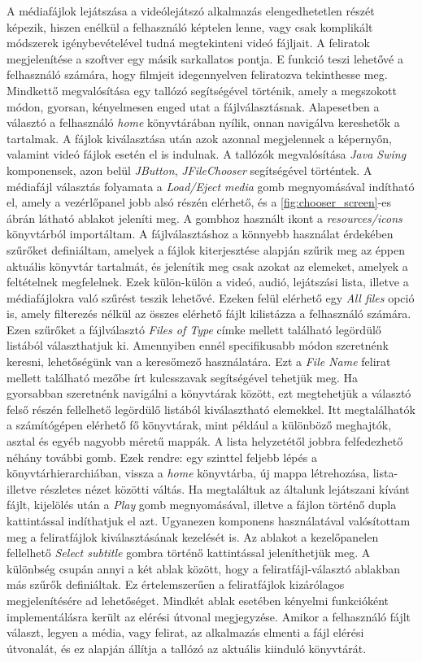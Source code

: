 A médiafájlok lejátszása a videólejátszó alkalmazás elengedhetetlen részét képezik, hiszen enélkül a felhasználó képtelen lenne, vagy csak komplikált módszerek igénybevételével tudná megtekinteni videó fájljait. A feliratok megjelenítése a szoftver egy másik sarkallatos pontja. E funkció teszi lehetővé a felhasználó számára, hogy filmjeit idegennyelven feliratozva tekinthesse meg. Mindkettő megvalósítása egy tallózó segítségével történik, amely a megszokott módon, gyorsan, kényelmesen enged utat a fájlválasztásnak. Alapesetben a választó a felhasználó \textit{home} könyvtárában nyílik, onnan navigálva kereshetők a tartalmak. A fájlok kiválasztása után azok azonnal megjelennek a képernyőn, valamint videó fájlok esetén el is indulnak. A tallózók megvalósítása \textit{Java Swing} komponensek, azon belül \textit{JButton}, \textit{JFileChooser} segítségével történtek. A médiafájl választás folyamata a \textit{Load/Eject media} gomb megnyomásával indítható el, amely a vezérlőpanel jobb alsó részén elérhető, és a \ref{fig:chooser_screen}-es ábrán látható ablakot jeleníti meg. A gombhoz használt ikont a \textit{resources/icons} könyvtárból importáltam. A fájlválasztáshoz a könnyebb használat érdekében szűrőket definiáltam, amelyek a fájlok kiterjesztése alapján szűrik meg az éppen aktuális könyvtár tartalmát, és jelenítik meg csak azokat az elemeket, amelyek a feltételnek megfelelnek. Ezek külön-külön a videó, audió, lejátszási lista, illetve a médiafájlokra való szűrést teszik lehetővé. Ezeken felül elérhető egy \textit{All files} opció is, amely filterezés nélkül az összes elérhető fájlt kilistázza a felhasználó számára. Ezen szűrőket a fájlválasztó \textit{Files of Type} címke mellett található legördülő listából választhatjuk ki. Amennyiben ennél specifikusabb módon szeretnénk keresni, lehetőségünk van a keresőmező használatára. Ezt a \textit{File Name} felirat mellett található mezőbe írt kulcsszavak segítségével tehetjük meg. Ha gyorsabban szeretnénk navigálni a könyvtárak között, ezt megtehetjük a választó felső részén fellelhető legördülő listából kiválasztható elemekkel. Itt megtalálhatók a számítógépen elérhető fő könyvtárak, mint például a különböző meghajtók, asztal és egyéb nagyobb méretű mappák. A lista helyzetétől jobbra felfedezhető néhány további gomb. Ezek rendre: egy szinttel feljebb lépés a könyvtárhierarchiában, vissza a \textit{home} könyvtárba, új mappa létrehozása, lista- illetve részletes nézet közötti váltás. Ha megtaláltuk az általunk lejátszani kívánt fájlt, kijelölés után a \textit{Play} gomb megnyomásával, illetve a fájlon történő dupla kattintással indíthatjuk el azt. Ugyanezen komponens használatával valósítottam meg a feliratfájlok kiválasztásának kezelését is. Az ablakot a kezelőpanelen fellelhető \textit{Select subtitle} gombra történő kattintással jeleníthetjük meg. A különbség csupán annyi a két ablak között, hogy a feliratfájl-választó ablakban más szűrők definiáltak. Ez értelemszerűen a feliratfájlok kizárólagos megjelenítésére ad lehetőséget. Mindkét ablak esetében kényelmi funkcióként implementálásra került az elérési útvonal megjegyzése. Amikor a felhasználó fájlt választ, legyen a média, vagy felirat, az alkalmazás elmenti a fájl elérési útvonalát, és ez alapján állítja a tallózó az aktuális kiinduló könyvtárát.


